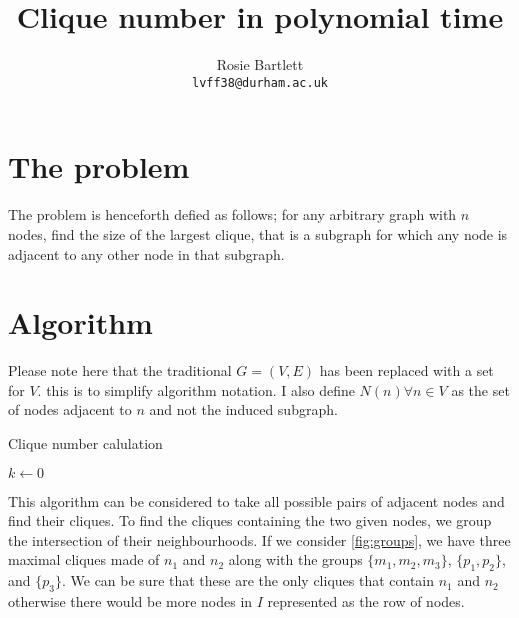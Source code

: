 \documentclass[11pt]{article}
\author{Rosie Bartlett\\\texttt{lvff38@durham.ac.uk}}
\title{Clique number in polynomial time}
\begin{document}
\maketitle


\section{The problem}
The problem is henceforth defied as follows; for any arbitrary graph with $n$ nodes, find the size of the largest clique, that is a subgraph for which any node is adjacent to any other node in that subgraph.

\section{Algorithm}
Please note here that the traditional $G=(V,E)$ has been replaced with a set for $V$. this is to simplify algorithm notation. I also define $N(n)\forall n\in V$ as the set of nodes adjacent to $n$ and not the induced subgraph.
\begin{algorithm}
\caption{Clique number calulation}\label{alg:main}
$k\gets 0$\\
\end{algorithm}

This algorithm can be considered to take all possible pairs of adjacent nodes and find their cliques. To find the cliques containing the two given nodes, we group the intersection of their neighbourhoods. If we consider \cref{fig:groups}, we have three maximal cliques made of $n_1$ and $n_2$ along with the groups $\{m_1,m_2,m_3\}$, $\{p_1,p_2\}$, and $\{p_3\}$. We can be sure that these are the only cliques that contain $n_1$ and $n_2$ otherwise there would be more nodes in $I$ represented as the row of nodes.
\end{document}
